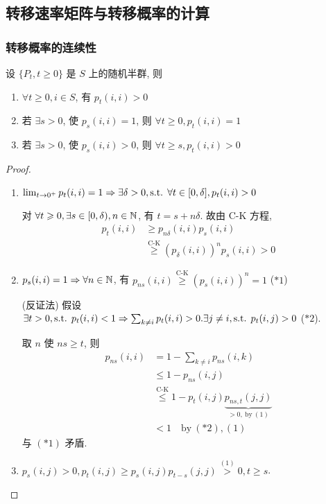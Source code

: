 \subsection{转移速率矩阵与转移概率的计算}
\subsubsection{转移概率的连续性}
\begin{proposition}\label{prop:p122-prop1}
    设 $\{P_t,t\geq 0\}$ 是 $S$ 上的随机半群, 则
    \begin{enumerate}
        \item $\forall t\geq 0,i\in S$, 有 $p_t(i,i)>0$
        \item 若 $\exists s>0$, 使 $p_s(i,i)=1$, 则 $\forall t\geq 0,p_t(i,i)=1$
        \item 若 $\exists s>0$, 使 $p_s(i,i)>0$, 则 $\forall t\geq s,p_t(i,i)>0$
    \end{enumerate}
\end{proposition}

\begin{proof}
\begin{enumerate}
    \item $\lim_{t \to 0^+}p_t(i,i)=1\Rightarrow \exists\delta>0,\text{s.t. } \forall t\in [0,\delta], p_t(i,i)>0$

对 $\forall t\geqslant 0, \exists s\in [0,\delta),n\in \mathbb{N}$, 有 $t=s+n\delta$. 故由 C-K 方程, 
\[
\begin{aligned}
    p_t(i,i) &\geq p_{n\delta}(i,i)p_s(i,i)\\
    &\overset{\text{C-K}}{\geq} (p_{\delta}(i,i))^np_s(i,i)>0
\end{aligned}
\]
    \item $p_s(i,i)=1\Rightarrow \forall n\in \mathbb{N}$, 有 $p_{ns}(i,i)\overset{\text{C-K}}{\geq}(p_s(i,i))^n=1$ ($*1$)
    
    (反证法) 假设 $\exists t>0,\text{s.t. } p_t(i,i)<1\Rightarrow \sum_{k\neq i}p_t(i,i)>0. \exists j\neq i,\text{s.t. } p_t(i,j)>0$ ($*2$).
    
    取 $n$ 使 $ns\geq t$, 则 
    \[
    \begin{aligned}
        p_{ns}(i,i) &=1-\sum_{k\neq i}p_{ns}(i,k)\\
        &\leq 1-p_{ns}(i,j)\\
        &\overset{\text{C-K}}{\leq} 1-p_t(i,j)\underbrace{p_{ns,t}(j,j)}_{>0,\ \text{by}\ (1)}\\
        &< 1\quad \text{by}\ (*2), (1)
    \end{aligned}
    \]
    与 $(*1)$ 矛盾.
    \item $p_s(i,j)>0,p_t(i,j)\geq p_s(i,j)p_{t-s}(j,j)\overset{(1)}{>}0, t\geq s$.
\end{enumerate}
\end{proof}

